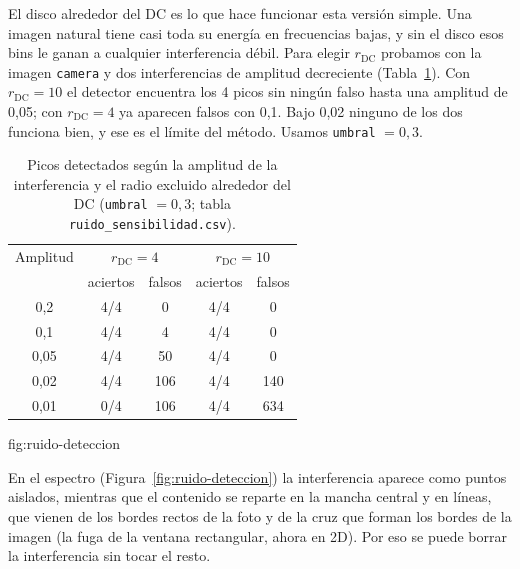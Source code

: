El disco alrededor del DC es lo que hace funcionar esta versión simple. Una imagen natural tiene
casi toda su energía en frecuencias bajas, y sin el disco esos bins le ganan a cualquier
interferencia débil. Para elegir $r_{\text{DC}}$ probamos con la imagen \texttt{camera} y dos
interferencias de amplitud decreciente (Tabla~\ref{tab:sensibilidad}). Con $r_{\text{DC}}=10$
el detector encuentra los 4 picos sin ningún falso hasta una amplitud de 0{,}05; con
$r_{\text{DC}}=4$ ya aparecen falsos con 0{,}1. Bajo 0{,}02 ninguno de los dos funciona bien, y
ese es el límite del método. Usamos \texttt{umbral} $=0{,}3$.

\begin{table}[htbp]
  \centering
  \small
  \begin{tabular}{ccccc}
    \toprule
    Amplitud & \multicolumn{2}{c}{$r_{\text{DC}}=4$} & \multicolumn{2}{c}{$r_{\text{DC}}=10$} \\
             & aciertos & falsos & aciertos & falsos \\
    \midrule
    0{,}2  & 4/4 & 0   & 4/4 & 0   \\
    0{,}1  & 4/4 & 4   & 4/4 & 0   \\
    0{,}05 & 4/4 & 50  & 4/4 & 0   \\
    0{,}02 & 4/4 & 106 & 4/4 & 140 \\
    0{,}01 & 0/4 & 106 & 4/4 & 634 \\
    \bottomrule
  \end{tabular}
  \caption{Picos detectados según la amplitud de la interferencia y el radio excluido alrededor
    del DC (\texttt{umbral} $=0{,}3$; tabla \texttt{ruido\_sensibilidad.csv}).}
  \label{tab:sensibilidad}
\end{table}

%
  {fig:ruido-deteccion}

En el espectro (Figura~\ref{fig:ruido-deteccion}) la interferencia aparece como puntos aislados,
mientras que el contenido se reparte en la mancha central y en líneas, que vienen de los bordes
rectos de la foto y de la cruz que forman los bordes de la imagen (la fuga de la ventana
rectangular, ahora en 2D). Por eso se puede borrar la interferencia sin tocar el resto.